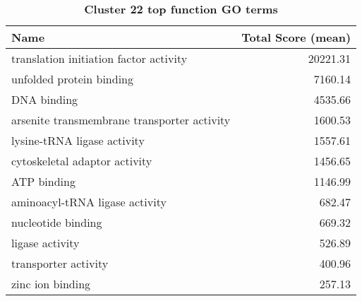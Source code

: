 \begin{table}[h]
\begin{center} \sf
\begin{tabular}{p{}r}
\toprule
\textbf{Name}                               & \textbf{Total Score (mean)} \\ \midrule
translation initiation factor activity      & 20221.31                    \\
unfolded protein binding                    & 7160.14                     \\
DNA binding                                 & 4535.66                     \\
arsenite transmembrane transporter activity & 1600.53                     \\
lysine-tRNA ligase activity                 & 1557.61                     \\
cytoskeletal adaptor activity               & 1456.65                     \\
ATP binding                                 & 1146.99                     \\
aminoacyl-tRNA ligase activity              & 682.47                      \\
nucleotide binding                          & 669.32                      \\
ligase activity                             & 526.89                      \\
transporter activity                        & 400.96                      \\
zinc ion binding                            & 257.13                      \\ \bottomrule                     
\end{tabular}
\end{center}

\caption[Cluster 22 top function GO terms]{\sf \textbf{Cluster 22 top function GO terms}}
\label{tab:cls22-function}
\end{table}